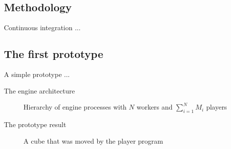 \documentclass{beamer}
\begin{document}
\subsection{Methodology}
\begin{frame}{Continuous integration}
...
\end{frame}
\subsection{The first prototype}
\begin{frame}{A simple prototype}
...
\end{frame}
\begin{frame}{The engine architecture}
\begin{figure}[H]
\begin{center}
\noindent\resizebox{\textwidth}{!}{

}
\end{center}
\caption{Hierarchy of engine processes with $N$ workers and $\sum_{i=1}^N M_i$ players}
\label{engine_arch}
\end{figure}
\end{frame}
\begin{frame}{The prototype result}
\begin{figure}[H]
\begin{center}
\noindent{}
\end{center}
\caption{A cube that was moved by the player program}
\label{cube_movement}
\end{figure}
\end{frame}
\end{document}
